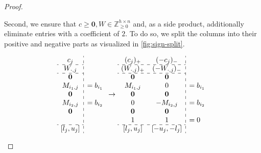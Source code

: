 \documentclass[a4paper,UKenglish,cleveref,thm-restate]{lipics-v2021}
\makeatletter
\newcommand{\Z}{\mathbb Z}
\newcommand{\veczero}{\mathbf0}
\newenvironment{cdisplaymath}{\@fleqnfalse\begin{displaymath}}{\end{displaymath}}
\makeatother
\begin{document}
\begin{proof}
\begin{claimproof}
        Second, we ensure that $c\ge\veczero,W\in\Z_{\ge0}^{h\times n}$ and, as a side product, additionally eliminate entries with a coefficient of $2$. To do so, we split the columns into their positive and negative parts as visualized in \cref{fig:sign-split}.
        \begin{figure}[H]
            \centering
            \begin{subfigure}{0.55\textwidth}
                \begin{cdisplaymath}
                    \begin{array}{c:l}
                        c_j\\
                        \cdashline{1-1}{}
                        W_{\cdot,j}&\\
                        \cdashline{1-1}{}
                        \veczero&\\
                        M_{i_1,j}&=b_{i_1}\\
                        \veczero&\\
                        M_{i_2,j}&=b_{i_2}\\
                        \veczero&\\
                        \\
                        \cdashline{1-1}{}
                        [l_j,u_j]&
                    \end{array}
                    \to
                    \begin{array}{c c:l}
                        (c_j)_+&(-c_j)_-&\\
                        \cdashline{1-2}{}
                        (W_{\cdot,j})_+&(-W_{\cdot,j})_-\\
                        \cdashline{1-2}{}
                        \veczero&\veczero\\
                        M_{i_1,j}&0&=b_{i_1}\\
                        \veczero&\veczero\\
                        0&-M_{i_2,j}&=b_{i_2}\\
                        \veczero&\veczero\\
                        1&1&=0\\
                        \cdashline{1-2}{}
                        [l_j,u_j]&[-u_j,-l_j]&
                    \end{array}
                \end{cdisplaymath}

\end{subfigure}
\end{figure}
\end{claimproof}
\end{proof}
\end{document}
